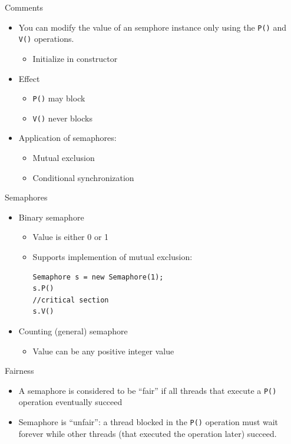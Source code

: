 \begin{frame}{Comments}
  \begin{itemize}
  \item You can modify the value of an semphore instance only using
    the \lstinline!P()! and \lstinline!V()! operations.
    \begin{itemize}
    \item Initialize in constructor
    \end{itemize}
  \item Effect
    \begin{itemize}
    \item \lstinline!P()! may block 
    \item \lstinline!V()! never blocks
    \end{itemize}
  \item Application of semaphores:
    \begin{itemize}
    \item Mutual exclusion
    \item Conditional synchronization
    \end{itemize}
  \end{itemize}
\end{frame}

\begin{frame}[fragile]{Semaphores}
  \begin{itemize}
  \item Binary  semaphore
    \begin{itemize}
    \item Value is either 0 or 1
    \item Supports implemention of  mutual exclusion:
\begin{lstlisting}
Semaphore s = new Semaphore(1);
s.P()
//critical section
s.V()
\end{lstlisting}
    \end{itemize}
  \item Counting (general) semaphore
    \begin{itemize}
    \item Value can be any positive integer value
    \end{itemize}
  \end{itemize}
\end{frame}

\begin{frame}{Fairness}
  \begin{itemize}
  \item A semaphore is considered to be ``fair'' if all threads that
    execute a \lstinline!P()! operation eventually succeed
  \item Semaphore is ``unfair'': a thread blocked in the
    \lstinline!P()! operation must wait forever while other threads
    (that executed the operation later) succeed.
  \end{itemize}
\end{frame}

